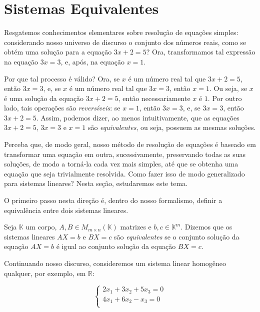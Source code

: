 
\section{Sistemas Equivalentes}
Resgatemos conhecimentos elementares sobre resolução de equações simples: considerando nosso universo de discurso o conjunto dos números reais, como se obtém uma solução para a equação $3x+2=5$?
Ora, transformamos tal expressão na equação $3x=3$, e, após, na equação $x=1$.

Por que tal processo é válido?
Ora, se $x$ é um número real tal que $3x+2=5$, então $3x=3$, e, se $x$ é um número real tal que $3x=3$, então $x=1$.
Ou seja, se $x$ é uma solução da equação $3x+2=5$, então necessariamente $x$ é $1$.
Por outro lado, tais operações são \emph{reversíveis}: se $x=1$, então $3x=3$, e, se $3x=3$, então $3x+2=5$.
Assim, podemos dizer, ao menos intuitivamente, que as equações $3x+2=5$, $3x=3$ e $x=1$ são \emph{equivalentes}, ou seja, possuem as mesmas soluções.

Perceba que, de modo geral, nosso método de resolução de equações é baseado em transformar uma equação em outra, sucessivamente, preservando todas as suas soluções, de modo a torná-la cada vez mais simples, até que se obtenha uma equação que seja trivialmente resolvida.
Como fazer isso de modo generalizado para sistemas lineares?
Nesta seção, estudaremos este tema.

O primeiro passo nesta direção é, dentro do nosso formalismo, definir a equivalência entre dois sistemas lineares.

\begin{definition}
    Seja $\mathbb K$ um corpo, $A, B\in M_{m \times n}(\mathbb K)$ matrizes e $b, c \in \mathbb K^m$.
    Dizemos que os sistemas lineares $AX=b$ e $BX=c$ são \emph{equivalentes} se o conjunto solução da equação $AX=b$ é igual ao conjunto solução da equação $BX=c$.
\end{definition}

Continuando nosso discurso, consideremos um sistema linear homogêneo qualquer, por exemplo, em $\mathbb R$:

\begin{equation}\label{eq:exemploSistema}
    \begin{cases}
        2x_1 + 3x_2 + 5x_3 = 0 \\
        4x_1 + 6x_2 - x_3 = 0 \\
    \end{cases}
\end{equation}

